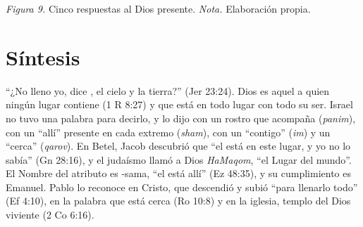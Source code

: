 \begin{center}
\par
{\footnotesize\color{gris}\textit{Figura 9.} Cinco respuestas al Dios presente. \textit{Nota.} Elaboración propia.}
\end{center}

\section{Síntesis}

\begin{tcolorbox}[colback=papiro,colframe=azul,boxrule=1pt,arc=3pt]
``¿No lleno yo, dice \SENOR{}, el cielo y la tierra?'' (Jer 23:24). Dios es aquel a quien ningún lugar contiene (1 R 8:27) y que está en todo lugar con todo su ser. Israel no tuvo una palabra para decirlo, y lo dijo con un rostro que acompaña (\emph{panim}), con un ``allí'' presente en cada extremo (\emph{sham}), con un ``contigo'' (\emph{im}) y un ``cerca'' (\emph{qarov}). En Betel, Jacob descubrió que ``el \SENOR{} está en este lugar, y yo no lo sabía'' (Gn 28:16), y el judaísmo llamó a Dios \emph{HaMaqom}, ``el Lugar del mundo''. El Nombre del atributo es \SENOR{}-sama, ``el \SENOR{} está allí'' (Ez 48:35), y su cumplimiento es Emanuel. Pablo lo reconoce en Cristo, que descendió y subió ``para llenarlo todo'' (Ef 4:10), en la palabra que está cerca (Ro 10:8) y en la iglesia, templo del Dios viviente (2 Co 6:16).
\end{tcolorbox}

